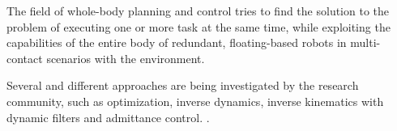 \def\q{\mathbf{q}}
\def\dq{\mathbf{\dot{q}}}
\def\J{\mathbf{J}}
\def\A{\mathbf{A}}
\def\B{\mathcal{B}}
\def\C{\mathcal{C}}
\def\T{\mathcal{T}}
\def\W{\mathbf{W}}
\def\b{\mathbf{b}}
\def\I{\mathbf{I}}
\def\x{\mathbf{x}}
\def\dx{\mathbf{\dot{x}}}
\def\e{\mathbf{e}}
\def\de{\mathbf{\dot{e}}}
\def\w{\mathbf{w}}



The field of whole-body planning and control tries to find the solution to the problem of executing one or more task at the same time, while exploiting the capabilities of the entire body of redundant, floating-based robots in multi-contact scenarios with the environment.


Several and different approaches are being investigated by the research community, such as optimization, inverse dynamics, inverse kinematics with dynamic filters and admittance control. .

